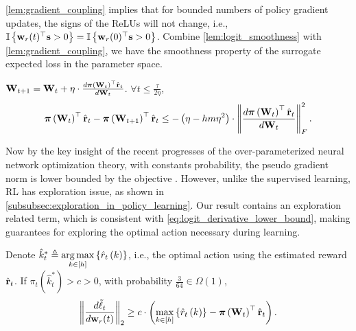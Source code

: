 \cref{lem:gradient_coupling} implies that for bounded numbers of policy gradient updates, the signs of the ReLUs will not change, i.e., ${\mathbb{I}}\left\{ {\mathbf{w}}_r(t)^\top {\mathbf{s}} > 0 \right\} = {\mathbb{I}}\left\{ {\mathbf{w}}_r(0)^\top {\mathbf{s}} > 0 \right\}$. Combine \cref{lem:logit_smoothness} with \cref{lem:gradient_coupling}, we have the smoothness property of the surrogate expected loss in the parameter space.
\begin{lem}
\label{lem:empirically_expected_reward_parameter_smoothness}
    ${\mathbf{W}}_{t+1} = {\mathbf{W}}_t + \eta \cdot \frac{d {\boldsymbol{\pi}}\left({\mathbf{W}}_t\right)^\top \hat{{\mathbf{r}}}_t}{d {\mathbf{W}}_t}$. $\forall t \le \frac{\tau}{ 2 \eta }$,
\begin{equation}
\label{eq:parameter_smoothness}
\begin{split}
    {\boldsymbol{\pi}}\left( {\mathbf{W}}_t \right)^\top \hat{{\mathbf{r}}}_t - {\boldsymbol{\pi}}\left( {\mathbf{W}}_{t+1} \right)^\top \hat{{\mathbf{r}}}_t \le - \left( \eta - h m \eta^2 \right) \cdot \left\| \frac{d {\boldsymbol{\pi}}\left( {\mathbf{W}}_t \right)^\top \hat{{\mathbf{r}}}_t}{d {\mathbf{W}}_t} \right\|_F^2.
\end{split}
\end{equation}
\end{lem}

Now by the key insight of the recent progresses of the over-parameterized neural network optimization theory, with constants probability, the pseudo gradient norm is lower bounded by the objective \citep{li2018learning}. However, unlike the supervised learning, RL has exploration issue, as shown in \cref{subsubsec:exploration_in_policy_learning}. Our result contains an exploration related term, which is consistent with \cref{eq:logit_derivative_lower_bound}, making guarantees for exploring the optimal action necessary during learning.

\begin{lem}
\label{lem:gradient_lower_bound}
	Denote $\hat{k}_t^* \triangleq \operatorname*{arg\,max}\limits_{k \in [h]}\left\{ \hat{r}_{t}\left(k\right) \right\}$, i.e., the optimal action using the estimated reward $ \hat{{\mathbf{r}}}_t$. If $\pi_t\left(\hat{k}_t^*\right) > c > 0$, with probability $\frac{3}{64} \in \Omega\left( 1 \right)$,
\begin{equation*}
\begin{split}
	\left\| \frac{d\tilde{\ell}_t}{d {\mathbf{w}}_r(t)} \right\|_2 \ge c \cdot \left( \max\limits_{k \in \left[h\right]}\left\{ \hat{r}_{t}\left(k\right) \right\} - {\boldsymbol{\pi}}\left( {\mathbf{W}}_t \right)^\top \hat{{\mathbf{r}}}_t \right) .
\end{split}
\end{equation*}
\end{lem}

